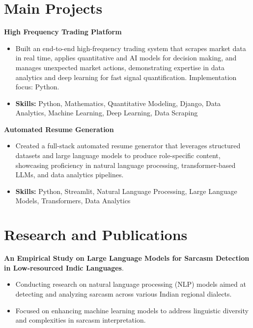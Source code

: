 \documentclass[a4paper,11pt]{article}
\begin{document}
\section{\textbf{Main Projects}}

\vspace{1mm}
  \textbf{High Frequency Trading Platform  }
\vspace{-1.5mm} %
\begin{itemize}
  \item Built an end-to-end high-frequency trading system that scrapes market data in real time, applies quantitative and AI models for decision making, and manages unexpected market actions, demonstrating expertise in data analytics and deep learning for fast signal quantification. Implementation focus: Python.
\vspace{-3mm}
  \item \textbf{Skills:} Python, Mathematics, Quantitative Modeling, Django, Data Analytics, Machine Learning, Deep Learning, Data Scraping
\end{itemize}


\vspace{1mm}
   \textbf{Automated Resume Generation }
\vspace{-1.5mm} %
\begin{itemize}
  \item Created a full-stack automated resume generator that leverages structured datasets and large language models to produce role-specific content, showcasing proficiency in natural language processing, transformer-based LLMs, and data analytics pipelines.
\vspace{-3mm}
  \item \textbf{Skills:} Python, Streamlit, Natural Language Processing, Large Language Models, Transformers, Data Analytics
\end{itemize}



\section{\textbf{Research and Publications} \hfill }
\vspace{1mm}
  \textbf{An Empirical Study on Large Language Models for Sarcasm Detection in Low-resourced Indic Languages}.
\vspace{-1mm} %
\begin{itemize}
  \item Conducting research on natural language processing (NLP) models aimed at detecting and analyzing sarcasm across various Indian regional dialects.
\vspace{-3mm}
  \item Focused on enhancing machine learning models to address linguistic diversity and complexities in sarcasm interpretation.
\end{itemize}
\end{document}
